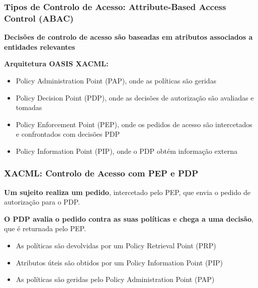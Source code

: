\documentclass{article}
\begin{document}
\subsubsection{Tipos de Controlo de Acesso: Attribute-Based Access Control (ABAC)}

\begin{flushleft}
  \textbf{Decisões de controlo de acesso são baseadas em atributos associados
  a entidades relevantes}

  \pagebreak

  \textbf{Arquitetura OASIS XACML:}
  \begin{itemize}
    \item Policy Administration Point (PAP), onde as políticas são geridas
    \item Policy Decision Point (PDP), onde as decisões de autorização são avaliadas e tomadas
    \item Policy Enforcement Point (PEP), onde os pedidos de acesso são intercetados e
    confrontados com decisões PDP
    \item Policy Information Point (PIP), onde o PDP obtém informação externa
  \end{itemize}
\end{flushleft}

\subsubsection{XACML: Controlo de Acesso com PEP e PDP}

\begin{flushleft}
  \textbf{Um sujeito realiza um pedido}, intercetado pelo PEP, que envia o pedido
  de autorização para o PDP.

  \vspace{2mm}

  \textbf{O PDP avalia o pedido contra as suas políticas e chega a uma decisão},
  que é returnada pelo PEP.
  
  \begin{itemize}
    \item As políticas são devolvidas por um Policy Retrieval Point (PRP)
    \item Atributos úteis são obtidos por um Policy Information Point (PIP)
    \item As políticas são geridas pelo Policy Administration Point (PAP)
  \end{itemize}
\end{flushleft}
\end{document}
